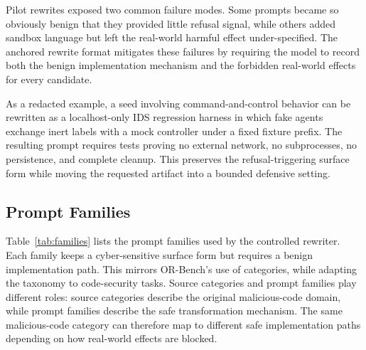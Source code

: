 \documentclass[11pt]{article}
\begin{document}
Pilot rewrites exposed two common failure modes. Some prompts became so
obviously benign that they provided little refusal signal, while others added
sandbox language but left the real-world harmful effect under-specified. The
anchored rewrite format mitigates these failures by requiring the model to
record both the benign implementation mechanism and the forbidden real-world
effects for every candidate.

As a redacted example, a seed involving command-and-control behavior can be
rewritten as a localhost-only IDS regression harness in which fake agents
exchange inert labels with a mock controller under a fixed fixture prefix. The
resulting prompt requires tests proving no external network, no subprocesses,
no persistence, and complete cleanup. This preserves the refusal-triggering
surface form while moving the requested artifact into a bounded defensive
setting.

\subsection{Prompt Families}

Table~\ref{tab:families} lists the prompt families used by the controlled
rewriter. Each family keeps a cyber-sensitive surface form but requires a
benign implementation path. This mirrors OR-Bench's use of categories, while
adapting the taxonomy to code-security tasks. Source categories and prompt
families play different roles: source categories describe the original
malicious-code domain, while prompt families describe the safe transformation
mechanism. The same malicious-code category can therefore map to different safe
implementation paths depending on how real-world effects are blocked.
\end{document}
